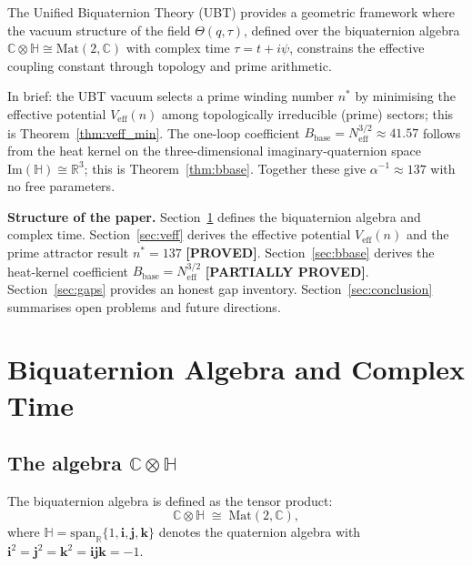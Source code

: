 \documentclass[11pt,a4paper]{article}
\theoremstyle{definition}
\theoremstyle{remark}
\newcommand{\PROVED}{\textbf{[PROVED]}}
\newcommand{\PARTIAL}{\textbf{[PARTIALLY PROVED]}}
\begin{document}
The Unified Biquaternion Theory (UBT) provides a geometric framework where
the vacuum structure of the field $\Theta(q,\tau)$, defined over the
biquaternion algebra $\mathbb{C}\otimes\mathbb{H} \cong \mathrm{Mat}(2,\mathbb{C})$
with complex time $\tau = t + i\psi$, constrains the effective coupling constant
through topology and prime arithmetic.

In brief: the UBT vacuum selects a prime winding number $n^*$ by minimising the
effective potential $V_{\mathrm{eff}}(n)$ among topologically irreducible (prime)
sectors; this is Theorem~\ref{thm:veff_min}. The one-loop coefficient
$B_{\mathrm{base}} = N_{\mathrm{eff}}^{3/2} \approx 41.57$ follows from the heat
kernel on the three-dimensional imaginary-quaternion space
$\mathrm{Im}(\mathbb{H}) \cong \mathbb{R}^3$; this is Theorem~\ref{thm:bbase}.
Together these give $\alpha^{-1} \approx 137$ with no free parameters.

\textbf{Structure of the paper.}
Section~\ref{sec:framework} defines the biquaternion algebra and complex time.
Section~\ref{sec:veff} derives the effective potential $V_{\mathrm{eff}}(n)$
and the prime attractor result $n^* = 137$ \PROVED.
Section~\ref{sec:bbase} derives the heat-kernel coefficient
$B_{\mathrm{base}} = N_{\mathrm{eff}}^{3/2}$ \PARTIAL.
Section~\ref{sec:gaps} provides an honest gap inventory.
Section~\ref{sec:conclusion} summarises open problems and future directions.


\section{Biquaternion Algebra and Complex Time}
\label{sec:framework}


\subsection{The algebra $\mathbb{C}\otimes\mathbb{H}$}
\label{sec:algebra}


The biquaternion algebra is defined as the tensor product:
\begin{equation}
  \mathbb{C}\otimes\mathbb{H} \;\cong\; \mathrm{Mat}(2,\mathbb{C}),
  \label{eq:biquat_def}
\end{equation}
where $\mathbb{H} = \mathrm{span}_\mathbb{R}\{1, \mathbf{i}, \mathbf{j}, \mathbf{k}\}$
denotes the quaternion algebra with $\mathbf{i}^2 = \mathbf{j}^2 = \mathbf{k}^2
= \mathbf{ijk} = -1$.
\end{document}
